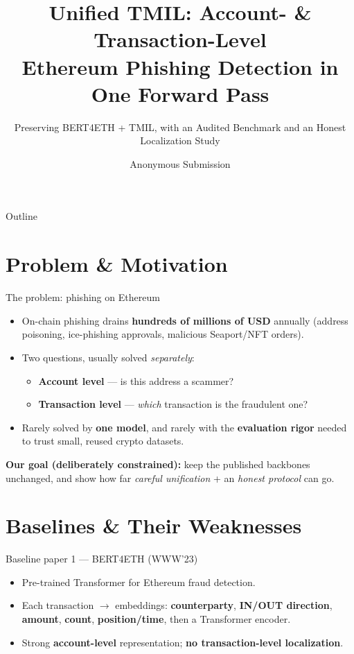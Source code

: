 \documentclass[aspectratio=169,10pt]{beamer}
\title[Unified TMIL for ETH Phishing]{Unified TMIL: Account- \& Transaction-Level\\Ethereum Phishing Detection in One Forward Pass}
\subtitle{Preserving BERT4ETH + TMIL, with an Audited Benchmark and an Honest Localization Study}
\author{Anonymous Submission}
\date{}
\begin{document}
\begin{frame}\titlepage\end{frame}

\begin{frame}{Outline}\tableofcontents\end{frame}

\section{Problem \& Motivation}
\begin{frame}{The problem: phishing on Ethereum}
\begin{itemize}
\item On-chain phishing drains \textbf{hundreds of millions of USD} annually (address poisoning, ice-phishing approvals, malicious Seaport/NFT orders).
\item Two questions, usually solved \emph{separately}:
\begin{itemize}
\item \textbf{Account level} --- is this address a scammer?
\item \textbf{Transaction level} --- \emph{which} transaction is the fraudulent one?
\end{itemize}
\item Rarely solved by \textbf{one model}, and rarely with the \textbf{evaluation rigor} needed to trust small, reused crypto datasets.
\end{itemize}
\vfill
\textbf{Our goal (deliberately constrained):} keep the published backbones unchanged, and show how far \emph{careful unification} + an \emph{honest protocol} can go.
\end{frame}

\section{Baselines \& Their Weaknesses}
\begin{frame}{Baseline paper 1 --- BERT4ETH (WWW'23)}
\begin{itemize}
\item Pre-trained Transformer for Ethereum fraud detection.
\item Each transaction $\to$ embeddings: \textbf{counterparty}, \textbf{IN/OUT direction}, \textbf{amount}, \textbf{count}, \textbf{position/time}, then a Transformer encoder.
\item Strong \textbf{account-level} representation; \textbf{no transaction-level localization}.
\end{itemize}
\end{frame}
\end{document}
